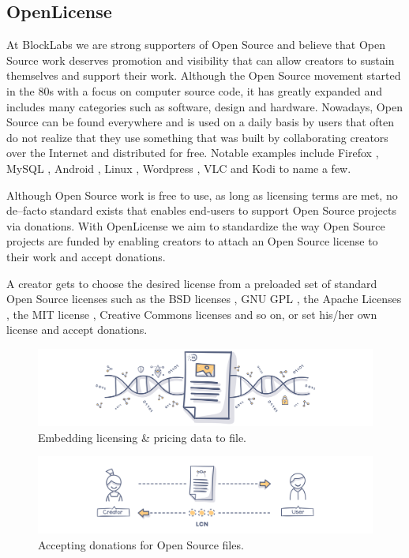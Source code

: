 \subsection{OpenLicense}

At BlockLabs we are strong supporters of Open Source and believe that Open Source work deserves promotion and visibility that can allow creators to sustain themselves and support their work. Although the Open Source movement started in the 80s with a focus on computer source code, it has greatly expanded and includes many categories such as software, design and hardware. Nowadays, Open Source can be found everywhere and is used on a daily basis by users that often do not realize that they use something that was built by collaborating creators over the Internet and distributed for free. Notable examples include Firefox \cite{firefox}, MySQL \cite{mysql}, Android \cite{android}, Linux \cite{linux}, Wordpress \cite{wordpress}, VLC \cite{vlc} and Kodi \cite{kodi} to name a few.

Although Open Source work is free to use, as long as licensing terms are met, no de--facto standard exists that enables end-users to support Open Source projects via donations. With OpenLicense we aim to standardize the way Open Source projects are funded by enabling creators to attach an Open Source license to their work and accept donations.

A creator gets to choose the desired license from a preloaded set of standard Open Source licenses such as the BSD licenses \cite{bsd}, GNU GPL \cite{gpl}, the Apache Licenses \cite{apache}, the MIT license \cite{mit}, Creative Commons  licenses \cite{cc} and so on, or set his/her own license and accept donations. 
 
\begin{figure}[!b]
\centering
\begin{minipage}{1\textwidth}
  \centering
  \includegraphics[width=1\linewidth]{./figures/fig3.png}
  \caption{Embedding licensing \& pricing data to file.}
  \label{fig:licensing}
\end{minipage}%
\end{figure}
\begin{figure}[!t]
\centering
\begin{minipage}{1\textwidth}
  \centering
  \includegraphics[width=1\linewidth]{./figures/fig4.png}
  \caption{Accepting donations for Open Source files.}
  \label{fig:donations}
\end{minipage}
\end{figure}


